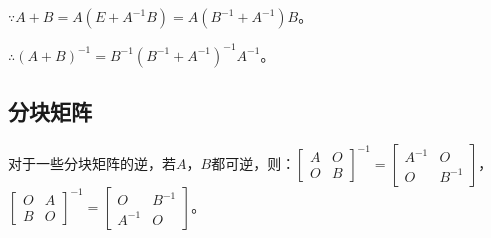 \documentclass[UTF8, 12pt]{ctexart}
\begin{document}
$\because A+B=A(E+A^{-1}B)=A(B^{-1}+A^{-1})B$。

$\therefore (A+B)^{-1}=B^{-1}(B^{-1}+A^{-1})^{-1}A^{-1}$。

\subsection{分块矩阵}

对于一些分块矩阵的逆，若$A$，$B$都可逆，则：$\left[\begin{array}{cc}
    A & O \\
    O & B
\end{array}\right]^{-1}=\left[\begin{array}{cc}
    A^{-1} & O \\
    O & B^{-1}
\end{array}\right]$，$\left[\begin{array}{cc}
    O & A \\
    B & O
\end{array}\right]^{-1}=\left[\begin{array}{cc}
    O & B^{-1} \\
    A^{-1} & O
\end{array}\right]$。
\end{document}
